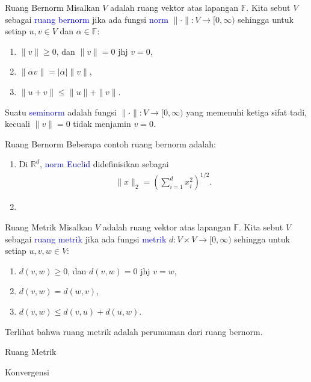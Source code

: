 \documentclass[xcolor={dvipsnames}, 9pt]{beamer}
\newcommand{\emp}[1]{\textcolor{Blue}{#1}}
\begin{document}
    \begin{frame}{Ruang Bernorm}
        Misalkan $V$ adalah ruang vektor atas lapangan $\mathbb{F}$. Kita sebut $V$ sebagai \emp{ruang bernorm} jika ada fungsi \emp{norm} $\|\cdot\|:V\to [0,\infty)$ sehingga untuk setiap $u,v\in V$ dan $\alpha\in\mathbb{F}$:
        \begin{enumerate}
            \item $\|v\|\geq 0$, dan $\|v\|=0$ jhj $v=0$,
            \item $\|\alpha v\|=|\alpha|\|v\|$,
            \item $\|u+v\|\leq\|u\|+\|v\|$.
        \end{enumerate}
        Suatu \emp{seminorm} adalah fungsi $\|\cdot\|:V\to[0,\infty)$ yang memenuhi ketiga sifat tadi, kecuali $\|v\|=0$ tidak menjamin $v=0$.
    \end{frame}
    \begin{frame}{Ruang Bernorm}
        Beberapa contoh ruang bernorm adalah:
        \begin{enumerate}
            \item Di $\mathbb{R}^d$, \emp{norm Euclid} didefinisikan sebagai
            \begin{align*}
                \|x\|_2 = \left(\sum_{i=1}^d x_i^2\right)^{1/2}.
            \end{align*}
            \item 
        \end{enumerate}
    \end{frame}
	\begin{frame}{Ruang Metrik}
		Misalkan $V$ adalah ruang vektor atas lapangan $\mathbb{F}$. Kita sebut $V$ sebagai \emp{ruang metrik} jika ada fungsi \emp{metrik} $d:V\times V\to [0,\infty)$ sehingga untuk setiap $u,v,w\in V$:
		\begin{enumerate}
			\item $d(v,w) \geq 0$, dan $d(v,w) = 0$ jhj $v=w$,
			\item $d(v,w) = d(w,v)$,
			\item $d(v,w) \leq d(v,u) + d(u,w)$.
		\end{enumerate}
        Terlihat bahwa ruang metrik adalah perumuman dari ruang bernorm.
	\end{frame}
    \begin{frame}{Ruang Metrik}
        
    \end{frame}
    \begin{frame}{Konvergensi}
        
    \end{frame}
\end{document}
